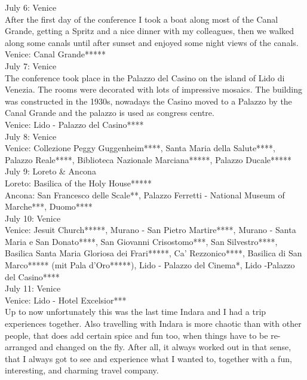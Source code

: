 July 6: Venice\\
After the first day of the conference I took a boat along most of the Canal Grande, getting a Spritz and a nice dinner with my colleagues, then we walked along some canals until after sunset and enjoyed some night views of the canals.\\

Venice: Canal Grande*****\\

July 7: Venice\\
The conference took place in the Palazzo del Casino on the island of Lido di Venezia. The rooms were decorated with lots of impressive mosaics. The building was constructed in the 1930s, nowadays the Casino moved to a Palazzo by the Canal Grande and the palazzo is used as congress centre.\\

Venice: Lido - Palazzo del Casino****\\

July 8: Venice\\
Venice: Collezione Peggy Guggenheim****, Santa Maria della Salute****, Palazzo Reale****, Biblioteca Nazionale Marciana*****, Palazzo Ducale*****\\

July 9: Loreto \& Ancona\\
Loreto: Basilica of the Holy House*****\\
Ancona: San Francesco delle Scale**, Palazzo Ferretti - National Museum of Marche***, Duomo****\\

July 10: Venice\\
Venice: Jesuit Church*****, Murano - San Pietro Martire****, Murano - Santa Maria e San Donato****, San Giovanni Crisostomo***, San Silvestro****, Basilica Santa Maria Gloriosa dei Frari*****, Ca' Rezzonico****, Basilica di San Marco***** (mit Pala d'Oro*****), Lido - Palazzo del Cinema*, Lido -Palazzo del Casino****\\

July 11: Venice\\
Venice: Lido - Hotel Excelsior***\\

Up to now unfortunately this was the last time Indara and I had a trip experiences together. Also travelling with Indara is more chaotic than with other people, that does add certain spice and fun too, when things have to be re-arranged and changed on the fly. After all, it always worked out in that sense, that I always got to see and experience what I wanted to, together with a fun, interesting, and charming travel company.\\

